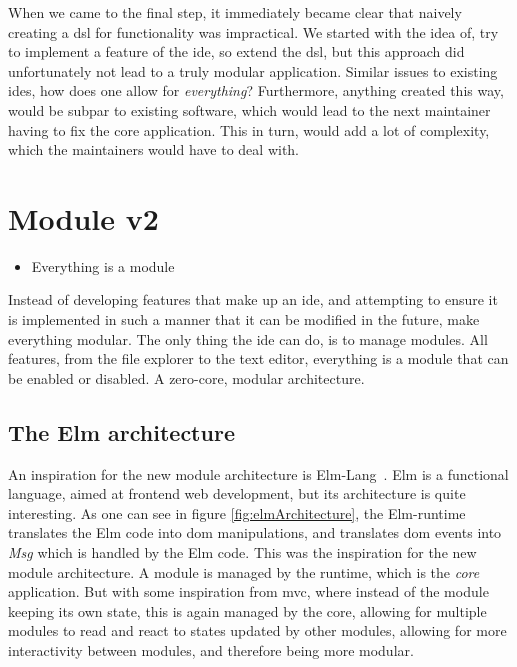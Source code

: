 When we came to the final step, it immediately became clear that naively
creating a \gls*{dsl} for functionality was impractical. We started with the
idea of, try to implement a feature of the \gls*{ide}, so extend the \gls*{dsl},
but this approach did unfortunately not lead to a truly modular application.
Similar issues to existing \gls*{ide}s, how does one allow for
\textit{everything}? Furthermore, anything created this way, would be subpar to
existing software, which would lead to the next maintainer having to fix the
core application. This in turn, would add a lot of complexity, which the
maintainers would have to deal with.


\section{Module v2} \label{sec:mod2}

\begin{itemize}
  \item Everything is a module
\end{itemize}

Instead of developing features that make up an \gls*{ide}, and attempting to
ensure it is implemented in such a manner that it can be modified in the future,
make everything modular. The only thing the \gls*{ide} can do, is to manage
modules. All features, from the file explorer to the text editor, everything is
a module that can be enabled or disabled. A zero-core, modular architecture.

\subsection{The Elm architecture}

An inspiration for the new module architecture is Elm-Lang~\cite{elmLang}. Elm
is a functional language, aimed at frontend web development, but its
architecture is quite interesting. As one can see in figure
\ref{fig:elmArchitecture}, the Elm-runtime translates the Elm code into
\gls*{dom} manipulations, and translates \gls*{dom} events into \textit{Msg}
which is handled by the Elm code. This was the inspiration for the new module
architecture. A module is managed by the runtime, which is the \textit{core}
application. But with some inspiration from \gls*{mvc}, where instead of the
module keeping its own state, this is again managed by the core, allowing for
multiple modules to read and react to states updated by other modules, allowing
for more interactivity between modules, and therefore being more modular.

